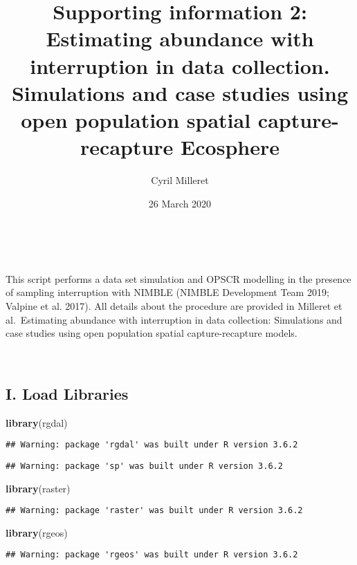 \documentclass[
]{article}
\title{Supporting information 2: Estimating abundance with interruption in data
collection. Simulations and case studies using open population spatial
capture-recapture \n Ecosphere}
\author{Cyril Milleret}
\date{26 March 2020}
\newenvironment{Shaded}{\begin{snugshade}}{\end{snugshade}}
\newcommand{\KeywordTok}[1]{\textcolor[rgb]{0.13,0.29,0.53}{\textbf{#1}}}
\newcommand{\NormalTok}[1]{#1}
\begin{document}
\maketitle

~

This script performs a data set simulation and OPSCR modelling in the
presence of sampling interruption with NIMBLE (NIMBLE Development Team
2019; Valpine et al. 2017). All details about the procedure are provided
in Milleret et al.~Estimating abundance with interruption in data
collection: Simulations and case studies using open population spatial
capture-recapture models.

~

\hypertarget{i.-load-libraries}{%
\subsection{I. Load Libraries}\label{i.-load-libraries}}

\begin{Shaded}
\begin{Highlighting}[]
\KeywordTok{library}\NormalTok{(rgdal)}
\end{Highlighting}
\end{Shaded}

\begin{verbatim}
## Warning: package 'rgdal' was built under R version 3.6.2
\end{verbatim}

\begin{verbatim}
## Warning: package 'sp' was built under R version 3.6.2
\end{verbatim}

\begin{Shaded}
\begin{Highlighting}[]
\KeywordTok{library}\NormalTok{(raster)}
\end{Highlighting}
\end{Shaded}

\begin{verbatim}
## Warning: package 'raster' was built under R version 3.6.2
\end{verbatim}

\begin{Shaded}
\begin{Highlighting}[]
\KeywordTok{library}\NormalTok{(rgeos)}
\end{Highlighting}
\end{Shaded}

\begin{verbatim}
## Warning: package 'rgeos' was built under R version 3.6.2
\end{verbatim}
\end{document}

